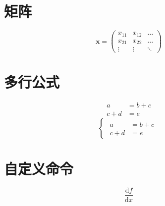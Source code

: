 \documentclass[12pt]{article}
\begin{document}
\section{矩阵}
\begin{displaymath}
	\mathbf{x}=
	\begin{pmatrix}
		x_{11} & x_{12} & \ldots \\
		x_{21} & x_{22} & \ldots \\
		\vdots & \vdots & \ddots
	\end{pmatrix}
\end{displaymath}
\section{多行公式}
\begin{align}
	a     & = b + c \\
	c + d & = e
\end{align}
\begin{equation}
	\begin{cases}
		\begin{aligned}
			a     & = b + c \\
			c + d & = e
		\end{aligned}
	\end{cases}
\end{equation}
\section{自定义命令}
\newcommand{\ud}{\mathrm{d}}
\newcommand{\dif}[2]{\frac{\ud {#1}}{\ud {#2}}}
\[ \dif fx \]
\end{document}
